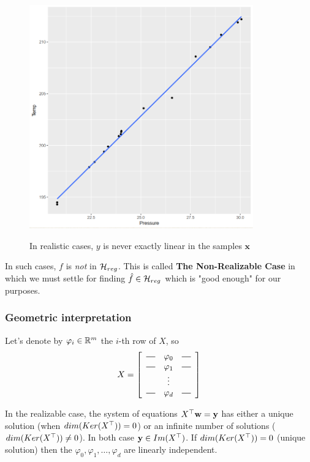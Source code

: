 \begin{figure}[h!]
  \centering
    \includegraphics[width=3.8in]{forbes.png} \\
 \caption{In realistic cases, $y$ is never exactly linear in the samples $\mathbf{x}$}
\end{figure}

In such cases, $f$ is \textit{not} in  $\mathcal{H}_{reg}$. This is called \textbf{The Non-Realizable Case} in which we must  settle for finding $\hat{f} \in \mathcal{H}_{reg}$ which is "good enough" for our purposes.


\subsubsection{Geometric interpretation}

Let's denote by $\varphi_i\in \mathbb{R}^m$ the $i$-th row of $X$, so
    \[
 X =
\left[
  \begin{array}{ccc}
    \horzbar & \varphi_{0} & \horzbar \\
    \horzbar &\varphi_{1} & \horzbar \\
   & \vdots    & \\
   \horzbar & \varphi_{d} & \horzbar
  \end{array}
\right]
\]

In the realizable case, the system of equations $X^{\top} \mathbf{w}=\mathbf{y}$ has either a unique solution (when $dim(Ker(X^{\top}))=0$) or an infinite number of solutions ($dim(Ker(X^{\top}))\neq 0$).
In both case $\mathbf{y}\in Im(X^{\top})$. If $dim(Ker(X^{\top}))=0$ (unique solution) then the $\varphi_0,\varphi_1,\ldots,\varphi_d$ are linearly independent.

